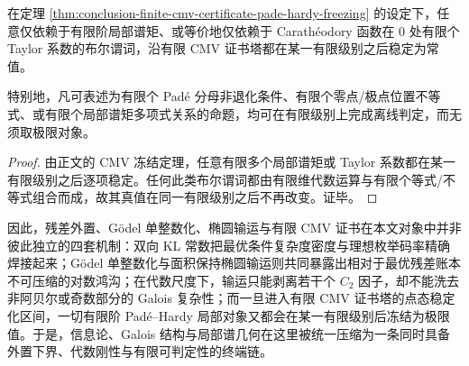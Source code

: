 \begin{corollary}[局部有理谱谓词的有限可判定性]\label{cor:conclusion-local-rational-spectral-predicates-finite-decidability}
在定理 \ref{thm:conclusion-finite-cmv-certificate-pade-hardy-freezing} 的设定下，任意仅依赖于有限阶局部谱矩、或等价地仅依赖于 Carath\'eodory 函数在 \(0\) 处有限个 Taylor 系数的布尔谓词，沿有限 CMV 证书塔都在某一有限级别之后稳定为常值。

特别地，凡可表述为有限个 Pad\'e 分母非退化条件、有限个零点/极点位置不等式、或有限个局部谱矩多项式关系的命题，均可在有限级别上完成离线判定，而无须取极限对象。
\end{corollary}
\begin{proof}
由正文的 CMV 冻结定理，任意有限多个局部谱矩或 Taylor 系数都在某一有限级别之后逐项稳定。任何此类布尔谓词都由有限维代数运算与有限个等式/不等式组合而成，故其真值在同一有限级别之后不再改变。证毕。
\end{proof}

\noindent
因此，残差外置、Gödel 单整数化、椭圆输运与有限 CMV 证书在本文对象中并非彼此独立的四套机制：双向 KL 常数把最优条件复杂度密度与理想枚举码率精确焊接起来；Gödel 单整数化与面积保持椭圆输运则共同暴露出相对于最优残差账本不可压缩的对数鸿沟；在代数尺度下，输运只能剥离若干个 \(C_2\) 因子，却不能洗去非阿贝尔或奇数部分的 Galois 复杂性；而一旦进入有限 CMV 证书塔的点态稳定化区间，一切有限阶 Pad\'e--Hardy 局部对象又都会在某一有限级别后冻结为极限值。于是，信息论、Galois 结构与局部谱几何在这里被统一压缩为一条同时具备外置下界、代数刚性与有限可判定性的终端链。

\endinput
